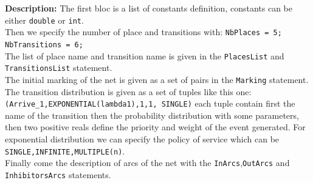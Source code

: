 \documentclass{article}
\begin{document}
{\bf Description:}
The first bloc is a list of constants definition, constants can be
either \verb|double| or \verb|int|.\\
Then we specify the number of place and transitions with:
\verb|NbPlaces = 5; NbTransitions = 6;|\\
The list of place name and transition name is given in the
\verb|PlacesList| and \verb|TransitionsList| statement.\\
The initial marking of the net is given as a set of pairs
in the \verb|Marking| statement.\\
The transition distribution is given as a set of tuples like
this one:\\ \verb|(Arrive_1,EXPONENTIAL(lambda1),1,1, SINGLE)|
each tuple contain first the name of the transition then
the probability distribution with some parameters, then two positive
reals define the priority and weight of the event generated.
For exponential distribution we can specify the policy of service
which can be \verb|SINGLE,INFINITE,MULTIPLE(n)|.\\
Finally come the description of arcs of the net with the 
\verb|InArcs|,\verb|OutArcs| and \verb|InhibitorsArcs| statements.
\end{document}
